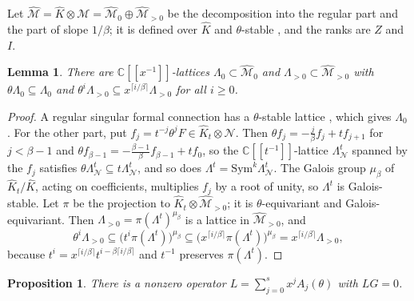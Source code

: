 \documentclass[11pt]{amsart}
\newtheorem{proposition}[thm]{Proposition}
\newtheorem{lemma}[thm]{Lemma}
\theoremstyle{definition}
\newcommand{\C}{\mathbb C}
\newcommand{\Sym}{\mathrm{Sym}}
\begin{document}
Let $\hat{\mathcal M}=\hat K\otimes\mathcal M=\hat{\mathcal M}_0\oplus\hat{\mathcal M}_{>0}$ be the decomposition into the regular part and the part of slope $1/\beta$; it is defined over $\hat K$ and $\theta$-stable \cite[Ch.~3]{vdPS03}, and the ranks are $Z$ and $I$.

\begin{lemma}\label{lem:lattices}
There are $\C[[x^{-1}]]$-lattices $\Lambda_0\subset\hat{\mathcal M}_0$ and $\Lambda_{>0}\subset\hat{\mathcal M}_{>0}$ with $\theta\Lambda_0\subseteq\Lambda_0$ and $\theta^i\Lambda_{>0}\subseteq x^{\lceil i/\beta\rceil}\Lambda_{>0}$ for all $i\ge0$.
\end{lemma}

\begin{proof}
A regular singular formal connection has a $\theta$-stable lattice \cite{Del70}, which gives $\Lambda_0$. For the other part, put $f_j=t^{-j}\theta^jF\in\hat K_t\otimes\mathcal N$. Then $\theta f_j=-\frac j\beta f_j+tf_{j+1}$ for $j<\beta-1$ and $\theta f_{\beta-1}=-\frac{\beta-1}\beta f_{\beta-1}+tf_0$, so the $\C[[t^{-1}]]$-lattice $\Lambda^t_{\mathcal N}$ spanned by the $f_j$ satisfies $\theta\Lambda^t_{\mathcal N}\subseteq t\Lambda^t_{\mathcal N}$, and so does $\Lambda^t=\Sym^k\Lambda^t_{\mathcal N}$. The Galois group $\mu_\beta$ of $\hat K_t/\hat K$, acting on coefficients, multiplies $f_j$ by a root of unity, so $\Lambda^t$ is Galois-stable. Let $\pi$ be the projection to $\hat K_t\otimes\hat{\mathcal M}_{>0}$; it is $\theta$-equivariant and Galois-equivariant. Then $\Lambda_{>0}=\pi(\Lambda^t)^{\mu_\beta}$ is a lattice in $\hat{\mathcal M}_{>0}$, and
\[
\theta^i\Lambda_{>0}\subseteq\bigl(t^i\pi(\Lambda^t)\bigr)^{\mu_\beta}\subseteq\bigl(x^{\lceil i/\beta\rceil}\pi(\Lambda^t)\bigr)^{\mu_\beta}=x^{\lceil i/\beta\rceil}\Lambda_{>0},
\]
because $t^i=x^{\lceil i/\beta\rceil}t^{i-\beta\lceil i/\beta\rceil}$ and $t^{-1}$ preserves $\pi(\Lambda^t)$.
\end{proof}

\begin{proposition}\label{prop:upper}
There is a nonzero operator $L=\sum_{j=0}^s x^jA_j(\theta)$ with $LG=0$.
\end{proposition}
\end{document}
